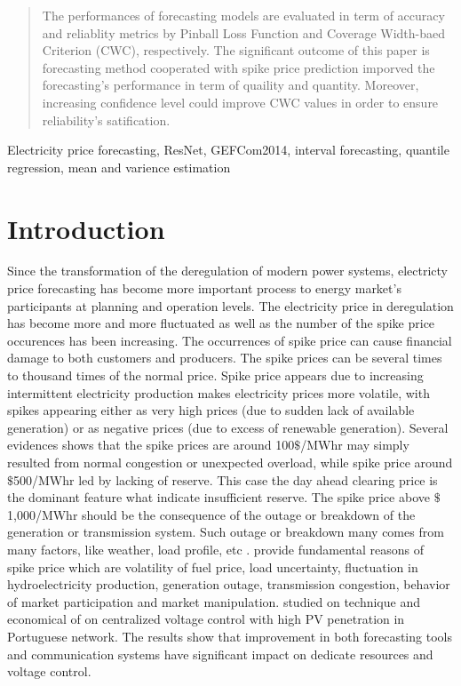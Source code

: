 \documentclass[review]{elsarticle}
\begin{document}
\begin{frontmatter}
\begin{abstract}
      The performances of forecasting models are evaluated in term of accuracy and reliablity metrics by Pinball Loss Function and Coverage Width-baed Criterion (CWC), respectively. The significant outcome of this paper is forecasting method cooperated with spike price prediction imporved the forecasting's performance in term of quaility and quantity. Moreover, increasing confidence level could improve CWC values in order to ensure reliability's satification.
    \end{abstract}

    \begin{keyword}
      Electricity price forecasting, ResNet, GEFCom2014, interval forecasting, quantile regression, mean and varience estimation
    \end{keyword}

  \end{frontmatter}

  \linenumbers

  \section{Introduction}

    Since the transformation of the deregulation of modern power systems, electricty price forecasting has become more important process to energy market's participants at planning and operation levels. The electricity price in deregulation has become more and more fluctuated as well as the number of the spike price occurences has been increasing. The occurrences of spike price can cause financial damage to both customers and producers. The spike prices can be several times to thousand times of the normal price. Spike price appears due to increasing intermittent electricity production makes electricity prices more volatile, with spikes appearing either as very high prices (due to sudden lack of available generation) or as negative prices (due to excess of renewable generation). Several evidences shows that the spike prices are around 100$\$$/MWhr may simply resulted from normal congestion or unexpected overload, while spike price around $\$$500/MWhr led by lacking of reserve. This case the day ahead clearing price is the dominant feature what indicate insufficient reserve. The spike price above $\$$1,000/MWhr should be the consequence of the outage or breakdown of the generation or transmission system. Such outage or breakdown many comes from many factors, like weather, load profile, etc  \cite{He2016}. \cite{SINGHAL2011550} provide fundamental reasons of spike price which are volatility of fuel price, load uncertainty, fluctuation in hydroelectricity production, generation outage, transmission congestion, behavior of market participation and market manipulation. \cite{GONZALEZSOTRES2017338} studied on technique and economical of on centralized voltage control with high PV penetration in Portuguese network. The results show that improvement in both forecasting tools and communication systems have significant impact on dedicate resources and voltage control.
\end{document}
